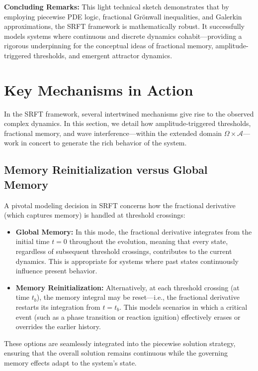 \documentclass[12pt]{article}
\begin{document}
\medskip

\noindent
\textbf{Concluding Remarks:}  
This light technical sketch demonstrates that by employing piecewise PDE logic, fractional Grönwall inequalities, and Galerkin approximations, the SRFT framework is mathematically robust. It successfully models systems where continuous and discrete dynamics cohabit—providing a rigorous underpinning for the conceptual ideas of fractional memory, amplitude-triggered thresholds, and emergent attractor dynamics.

\section{Key Mechanisms in Action}
\label{sec:key_mechanisms}

In the SRFT framework, several intertwined mechanisms give rise to the observed complex dynamics. In this section, we detail how amplitude-triggered thresholds, fractional memory, and wave interference—within the extended domain $\Omega \times \mathcal{A}$—work in concert to generate the rich behavior of the system.

\medskip

\subsection{Memory Reinitialization versus Global Memory}
\label{subsec:memory_choice}

A pivotal modeling decision in SRFT concerns how the fractional derivative (which captures memory) is handled at threshold crossings:
\begin{itemize}
    \item \textbf{Global Memory:}  
          In this mode, the fractional derivative integrates from the initial time $t=0$ throughout the evolution, meaning that every state, regardless of subsequent threshold crossings, contributes to the current dynamics. This is appropriate for systems where past states continuously influence present behavior.
    \item \textbf{Memory Reinitialization:}  
          Alternatively, at each threshold crossing (at time $t_b$), the memory integral may be reset—i.e., the fractional derivative restarts its integration from $t=t_b$. This models scenarios in which a critical event (such as a phase transition or reaction ignition) effectively erases or overrides the earlier history.
\end{itemize}
These options are seamlessly integrated into the piecewise solution strategy, ensuring that the overall solution remains continuous while the governing memory effects adapt to the system's state.
\end{document}
